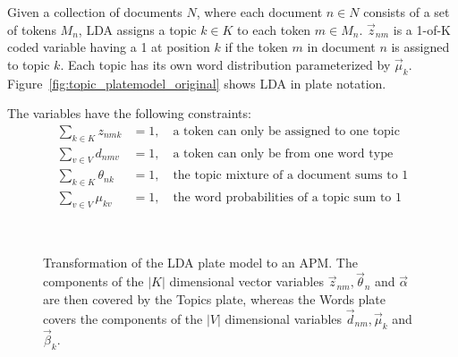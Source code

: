 Given a collection of documents $N$, where each document $n \in N$ consists of a set of tokens $M_n$, LDA assigns a topic $k \in K$ to each token $m \in M_n$. $\vec z_{nm}$ is a 1-of-K coded variable having a 1 at position $k$ if the token $m$ in document $n$ is assigned to topic $k$. Each topic has its own word distribution parameterized by $\vec \mu_k$. Figure~\ref{fig:topic_platemodel_original} shows LDA in plate notation.

The variables have the following constraints:
\begin{align}
\sum_{k \in K} z_{nmk} &= 1,\quad \text{a token can only be assigned to one topic}\\
\sum_{v \in V} d_{nmv} &= 1,\quad \text{a token can only be from one word type}\\
\sum_{k \in K} \theta_{nk} &= 1,\quad \text{the topic mixture of a document sums to 1}\\
\sum_{v \in V} \mu_{kv} &= 1,\quad \text{the word probabilities of a topic sum to 1}
\end{align}

\begin{figure}[t]
\begin{minipage}[t]{0.49\linewidth}
	\begin{center}
	\end{center}
\end{minipage}
\hspace{0.0cm}
\begin{minipage}[t]{0.49\linewidth}
	\begin{center}
	\end{center}
\end{minipage}\\
\caption[Transformation of LDA plate model to an APM]{Transformation of the LDA plate model to an APM. The components of the $|K|$ dimensional vector variables $\vec z_{nm}, \vec \theta_n$ and $\vec \alpha$ are then covered by the Topics plate, whereas the Words plate covers the components of the $|V|$ dimensional variables $\vec d_{nm}, \vec \mu_k$ and $\vec \beta_k$.}
\label{img:topic_platemodels}
\end{figure}

